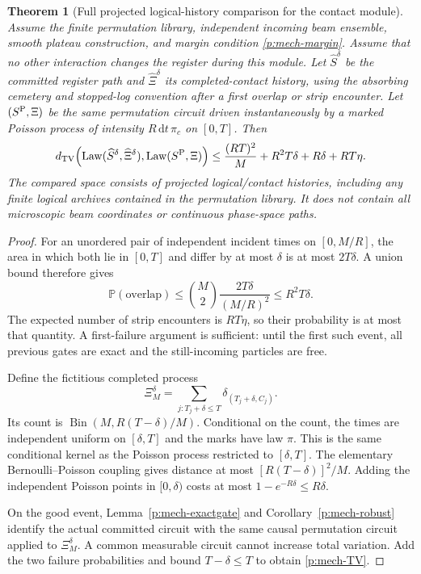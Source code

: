 \documentclass[11pt,oneside,openany]{book}
\newtheorem{theorem}{Theorem}[chapter]
\theoremstyle{definition}
\theoremstyle{remark}\newtheorem{remark}[theorem]{Remark}
\providecommand{\TV}{d_{\mathrm{TV}}}
\providecommand{\dd}{\,\mathrm d}
\providecommand{\pLaw}{\operatorname{Law}}
\begin{document}
\begin{theorem}[Full projected logical-history comparison for the contact module]
\label{p:mech-history}
Assume the finite permutation library, independent incoming beam ensemble,
smooth plateau construction, and margin condition
\eqref{p:mech-margin}. Assume that no other interaction changes the register
during this module. Let $\widehat S^\delta$ be the committed register path
and $\widehat\Xi^\delta$ its completed-contact history, using the absorbing
cemetery and stopped-log convention after a first overlap or strip encounter.
Let $(S^{\rm P},\Xi)$ be the same permutation circuit driven instantaneously
by a marked Poisson process of intensity $R\dd t\,\pi_c$ on $[0,T]$.
Then
\begin{equation}\label{p:mech-TV}
 \TV\!\left(
 \pLaw(\widehat S^\delta,\widehat\Xi^\delta),
 \pLaw(S^{\rm P},\Xi)\right)
 \le
 \frac{(RT)^2}{M}+R^2T\delta+R\delta+RT\eta.
\end{equation}
The compared space consists of projected logical/contact histories, including
any finite logical archives contained in the permutation library.
It does not contain all microscopic beam coordinates or continuous
phase-space paths.
\end{theorem}
\begin{proof}
For an unordered pair of independent incident times on $[0,M/R]$, the
area in which both lie in $[0,T]$ and differ by at most $\delta$ is at most
$2T\delta$. A union bound therefore gives
\[
 \mathbb P(\text{overlap})\le
 {M\choose2}\frac{2T\delta}{(M/R)^2}\le R^2T\delta.
\]
The expected number of strip encounters is $RT\eta$, so their probability
is at most that quantity. A first-failure argument is sufficient: until
the first such event, all previous gates are exact and the still-incoming
particles are free.

Define the fictitious completed process
\[
 \Xi_M^\delta=\sum_{j:T_j+\delta\le T}
                 \delta_{(T_j+\delta,C_j)}.
\]
Its count is $\operatorname{Bin}(M,R(T-\delta)/M)$.
Conditional on the count, the times are independent uniform on $[\delta,T]$
and the marks have law $\pi$. This is the same conditional kernel as the
Poisson process restricted to $[\delta,T]$.
The elementary Bernoulli--Poisson coupling gives distance at most
$[R(T-\delta)]^2/M$. Adding the independent Poisson points in $[0,\delta)$
costs at most $1-e^{-R\delta}\le R\delta$.

On the good event, Lemma~\ref{p:mech-exactgate} and
Corollary~\ref{p:mech-robust} identify the actual committed circuit with the
same causal permutation circuit applied to $\Xi_M^\delta$.
A common measurable circuit cannot increase total variation.
Add the two failure probabilities and bound $T-\delta\le T$ to obtain
\eqref{p:mech-TV}.
\end{proof}
\end{document}
